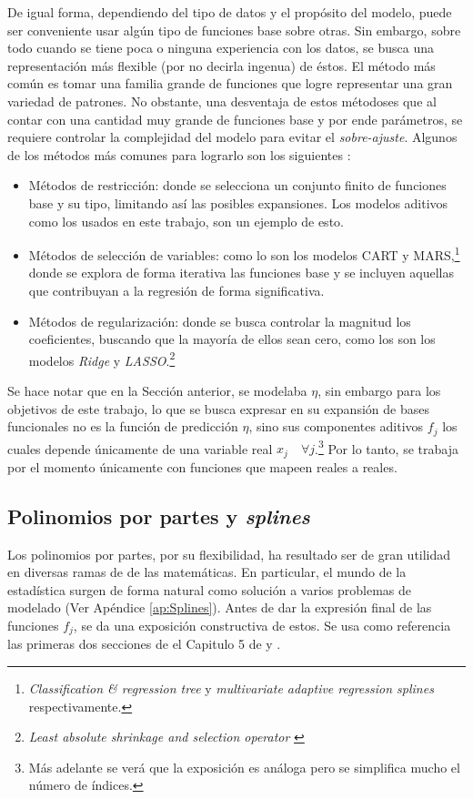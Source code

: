 \documentclass[../Main/Main.tex]{subfiles}
\begin{document}
De igual forma, dependiendo del tipo de datos y el propósito del modelo, puede ser conveniente usar algún tipo de funciones base sobre otras. Sin embargo, sobre todo cuando se tiene poca o ninguna experiencia con los datos, se busca una representación más flexible (por no decirla ingenua) de éstos. El método más común es tomar una familia grande de funciones que logre representar una gran variedad de patrones. No obstante, una desventaja de estos métodoses que al contar con una cantidad muy grande de funciones base y por ende parámetros, se requiere controlar la complejidad del modelo para evitar el \textit{sobre-ajuste}. Algunos de los métodos más comunes para lograrlo son los siguientes \autocite{hastie2008elements}:
\begin{itemize}[label={}]
	\item Métodos de restricción: donde se selecciona un conjunto finito de funciones base y su tipo, limitando así las posibles expansiones. Los modelos aditivos como los usados en este trabajo, son un ejemplo de esto.  
	\item Métodos de selección de variables: como lo son los modelos CART y MARS,\footnote{\textit{Classification \& regression tree} \autocite{breiman1984classification} y \textit{multivariate adaptive regression splines} \autocite{friedman1991multivariate} respectivamente.} donde se explora de forma iterativa las funciones base y se incluyen aquellas que contribuyan a la regresión de forma significativa.
	\item Métodos de regularización: donde se busca controlar la magnitud los coeficientes, buscando que la mayoría de ellos sean cero, como los son los modelos \textit{Ridge} y  \textit{LASSO}.\footnote{\textit{Least absolute shrinkage and selection operator} \autocite{hoerl1970ridge, tibshirani1996regression}}
\end{itemize}

Se hace notar que en la Sección anterior, se modelaba $\eta$, sin embargo para los objetivos de este trabajo, lo que se busca expresar en su expansión de bases funcionales no es la función de predicción $\eta$, sino sus componentes aditivos $f_j$ los cuales depende únicamente de una variable real $x_j \quad \forall j$.\footnote{Más adelante se verá que la exposición es análoga pero se simplifica mucho el número de índices.} Por lo tanto, se trabaja por el momento únicamente con funciones que mapeen reales a reales. 

\subsection{Polinomios por partes y \textit{splines}} \label{sec:PolisYSplines}
Los polinomios por partes, por su flexibilidad, ha resultado ser de gran utilidad en diversas ramas de de las matemáticas. En particular, el mundo de la estadística surgen de forma natural como solución a varios problemas de modelado (Ver Apéndice \ref{ap:Splines}). Antes de dar la expresión final de las funciones $f_j$, se da una exposición constructiva de estos. Se usa como referencia las primeras dos secciones de el Capitulo 5 de \citet{hastie2008elements} y \citet{wahba1990splines}. 
\end{document}
